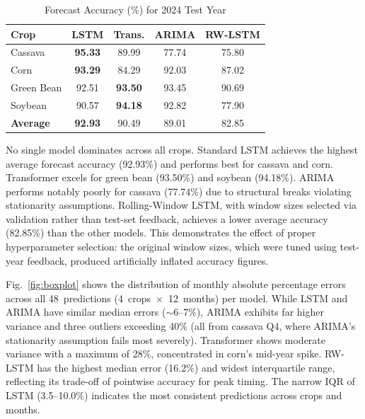 \documentclass[journal]{IEEEtran}
\begin{document}
\begin{table}[htbp]
  \centering
  \caption{Forecast Accuracy (\%) for 2024 Test Year}
  \label{tab:accuracy}
  \begin{tabular}{lcccc}
    \toprule
    \textbf{Crop} & \textbf{LSTM} & \textbf{Trans.} & \textbf{ARIMA} & \textbf{RW-LSTM} \\
    \midrule
    Cassava    & \textbf{95.33} & 89.99 & 77.74 & 75.80 \\
    Corn       & \textbf{93.29} & 84.29 & 92.03 & 87.02 \\
    Green Bean & 92.51          & \textbf{93.50} & 93.45 & 90.69 \\
    Soybean    & 90.57          & \textbf{94.18} & 92.82 & 77.90 \\
    \midrule
    \textbf{Average} & \textbf{92.93} & 90.49 & 89.01 & 82.85 \\
    \bottomrule
  \end{tabular}
\end{table}

No single model dominates across all crops. Standard LSTM achieves the highest average forecast accuracy (92.93\%) and performs best for cassava and corn. Transformer excels for green bean (93.50\%) and soybean (94.18\%). ARIMA performs notably poorly for cassava (77.74\%) due to structural breaks violating stationarity assumptions. Rolling-Window LSTM, with window sizes selected via validation rather than test-set feedback, achieves a lower average accuracy (82.85\%) than the other models. This demonstrates the effect of proper hyperparameter selection: the original window sizes, which were tuned using test-year feedback, produced artificially inflated accuracy figures.

Fig.~\ref{fig:boxplot} shows the distribution of monthly absolute percentage errors across all 48~predictions (4~crops~$\times$~12~months) per model. While LSTM and ARIMA have similar median errors ($\sim$6--7\%), ARIMA exhibits far higher variance and three outliers exceeding 40\% (all from cassava Q4, where ARIMA's stationarity assumption fails most severely). Transformer shows moderate variance with a maximum of 28\%, concentrated in corn's mid-year spike. RW-LSTM has the highest median error (16.2\%) and widest interquartile range, reflecting its trade-off of pointwise accuracy for peak timing. The narrow IQR of LSTM (3.5--10.0\%) indicates the most consistent predictions across crops and months.
\end{document}
